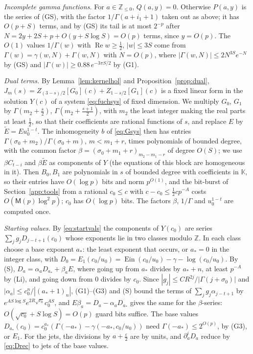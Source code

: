 \documentclass[11pt,reqno]{amsart}
\theoremstyle{definition}
\theoremstyle{remark}
\newcommand{\Ein}{\operatorname{Ein}}
\newcommand{\ZZ}{\mathbb{Z}}
\newcommand{\Mul}{\mathsf{M}}
\begin{document}
\begin{small}
\emph{Incomplete gamma functions.} For $a \in \ZZ_{\le0}$, $Q(a,y) = 0$. Otherwise $P(a,y)$ is the series of (GS),
with the factor $1/\Gamma(a + i_1 + 1)$ taken out as above; it has $O(p + S)$ terms, and by (GS) its tail is at most
$2^{-p}$ after $N = 2y + 2S + p + O(y + S\log S) = O(p)$ terms, since $y = O(p)$. The
$O(1)$ values $1/\Gamma(w)$ with $\operatorname{Re}w \ge \frac12$, $|w| \le 3S$ come from
$\Gamma(w) = \gamma(w, N) + \Gamma(w, N)$ with $N = O(p)$, where $|\Gamma(w,N)| \le 2N^{3S}e^{-N}$ by (GS) and
$|\Gamma(w)| \ge 0.88\,e^{-3\pi S/2}$ by (G1).

\emph{Dual terms.}\label{app:dual} By Lemma~\ref{lem:kernelhol} and Proposition~\ref{prop:dual},
$J_m(s) = Z_{(3-s)/2}[G_0](c) + Z_{1-s/2}[G_1](c)$ is a fixed linear form in the solution $Y(c)$ of a system
\eqref{eq:fuchsys} of fixed dimension. We multiply $G_0$, $G_1$ by $\Gamma(m_2 + \frac s2)$, $\Gamma(m_2 + \frac{s+1}2)$,
with $m_2$ the least integer making the real parts at least $\frac12$, so that their coefficients are rational
functions of $s$, and replace $E$ by $\widetilde E = Eu_0^{1-t}$. The inhomogeneity $b$ of \eqref{eq:Gsys} then has
entries $\Gamma(\sigma_0+m_2)/\Gamma(\sigma_0+m)$, $m < m_1 + r$, times polynomials of bounded degree, with the common
factor $\beta = (\sigma_0 + m_1 + r)_{m_2-m_1-r}$ of degree $O(S)$; we use $\beta C_{t-i}$ and $\beta\widetilde E$ as
components of $Y$ (the equations of this block are homogeneous in it). Then $B_0, B_1$ are polynomials in $s$ of bounded
degree with coefficients in $\mathbb K$, so their entries have $O(\log p)$ bits and norm $p^{O(1)}$, and the bit-burst
of Section~\ref{app:tools} from a rational $c_0 \le c$ with $c - c_0 \le \frac12cp^{-A}$ costs $O(\Mul(p)\log^2p)$;
$c_0$ has $O(\log p)$ bits. The factors $\beta$, $1/\Gamma$ and $u_0^{1-t}$ are computed once.

\emph{Starting values.} By \eqref{eq:startvals} the components of $Y(c_0)$ are series $\sum_jg_jD_{j-t+1}(c_0)$ whose
exponents lie in two classes modulo $\ZZ$. In each class choose a base exponent $a_*$: the least exponent that occurs,
or $a_* = 0$ in the integer class, with $D_0 = E_1(c_0/u_0) = \Ein(c_0/u_0) - \gamma - \log(c_0/u_0)$. By (S),
$D_a = \alpha_aD_{a_*} + \beta_aE$, where going up from $a_*$ divides by $a_* + n$, at least $p^{-A}$ by (Li), and
going down from $0$ divides by $c_0$. Since $|g_j| \le CR^{2j}/|\Gamma(j+\sigma_0)|$ and
$|\alpha_a| \le c_0^n/|(a_*+1)_n|$, (G1)--(G3) and (S) bound the terms of $\sum_jg_j\alpha_{j-t+1}$ by
$e^{AS\log S}e^{2R\sqrt{c_0}}c_0^{AS}$, and $E\beta_a = D_a - \alpha_aD_{a_*}$ gives the same for the $\beta$-series:
$O(\sqrt{c_0} + S\log S) = O(p)$ guard bits suffice. The base values $D_{a_*}(c_0) = c_0^{a_*}(\Gamma(-a_*) - \gamma(-a_*, c_0/u_0))$
need $\Gamma(-a_*) \le 2^{O(p)}$, by (G3), or $E_1$. For the jets, the divisions by $a + \frac\varepsilon2$ are by
units, and $\partial_a^iD_a$ reduce by \eqref{eq:Drec} to jets of the base values.


\end{small}
\end{document}

